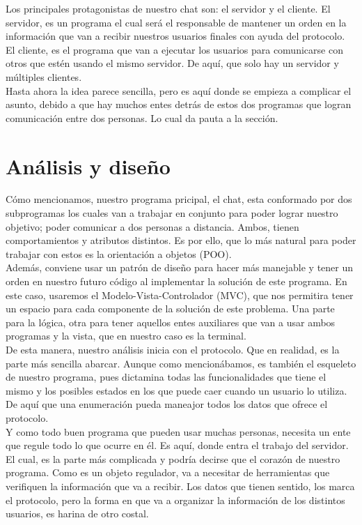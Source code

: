 \documentclass{article}
\begin{document}
Los principales protagonistas de nuestro chat son: el servidor y el cliente. El servidor, es un programa el cual será el responsable de mantener un orden en la información que van a recibir nuestros usuarios finales con ayuda del protocolo. El cliente, es el programa que van a ejecutar los usuarios para comunicarse con otros que estén usando el mismo servidor. De aquí, que solo hay un servidor y múltiples clientes.\\

Hasta ahora la idea parece sencilla, pero es aquí donde se empieza a complicar el asunto, debido a que hay muchos entes detrás de estos dos programas que logran comunicación entre dos personas. Lo cual da pauta a la sección.

\section*{Análisis y diseño}

Cómo mencionamos, nuestro programa pricipal, el chat, esta conformado por dos subprogramas los cuales van a trabajar en conjunto para poder lograr nuestro objetivo; poder comunicar a dos personas a distancia. Ambos, tienen comportamientos y atributos distintos. Es por ello, que lo más natural para poder trabajar con estos es la orientación a objetos (POO).\\

Además, conviene usar un patrón de diseño para hacer más manejable y tener un orden en nuestro futuro código al implementar la solución de este programa. En este caso, usaremos el Modelo-Vista-Controlador (MVC), que nos permitira tener un espacio para cada componente de la solución de este problema. Una parte para la lógica, otra para tener aquellos entes auxiliares que van a usar ambos programas y la vista, que en nuestro caso es la terminal.\\

De esta manera, nuestro análisis inicia con el protocolo. Que en realidad, es la parte más sencilla abarcar. Aunque como mencionábamos, es también el esqueleto de nuestro programa, pues dictamina todas las funcionalidades que tiene el mismo y los posibles estados en los que puede caer cuando un usuario lo utiliza. De aquí que una enumeración pueda maneajor todos los datos que ofrece el protocolo. \\

Y como todo buen programa que pueden usar muchas personas, necesita un ente que regule todo lo que ocurre en él. Es aquí, donde entra el trabajo del servidor. El cual, es la parte más complicada y podría decirse que el corazón de nuestro programa. Como es un objeto regulador, va a necesitar de herramientas que verifiquen la información que va a recibir. Los datos que tienen sentido, los marca el protocolo, pero la forma en que va a organizar la información de los distintos usuarios, es harina de otro costal.\\
\end{document}
